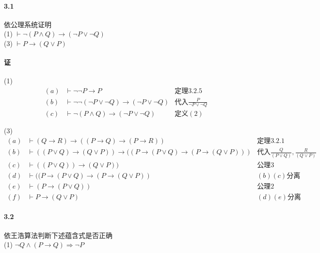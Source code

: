 \documentclass[hyperref, UTF8]{ctexart}
\newcommand{\zhfenli}{\text{分离}}
\newcommand{\zhdairu}{\text{代入}}
\newcommand{\zhaxiom}{\text{公理}}
\newcommand{\zhtheorem}{\text{定理}}
\newcommand{\zhdefinition}{\text{定义}}
\begin{document}
\paragraph{3.1}\label{3.1}
依公理系统证明 \\

(1) $  \vdash \lnot (P \land Q) \rightarrow ( \lnot P \lor \lnot Q) $ \\

(3) $ \vdash P \rightarrow (Q \lor P) $

\paragraph{证}

(1)
\begin{align*}
(a) & \vdash \lnot \lnot P \rightarrow P & \zhtheorem 3.2.5 \\
(b) & \vdash \lnot \lnot ( \lnot P \lor \lnot Q) \rightarrow ( \lnot P \lor \lnot Q) & \zhdairu \frac{P}{ \lnot P \lor \lnot Q} \\
(c) & \vdash \lnot (P \land Q) \rightarrow ( \lnot P \lor \lnot Q) & \zhdefinition (2) 
\end{align*}

(3)
\begin{align*}
(a) & \vdash (Q \rightarrow R) \rightarrow ((P \rightarrow Q) \rightarrow (P \rightarrow R)) & \zhtheorem 3.2.1 \\
(b) & \vdash ((P \lor Q) \rightarrow (Q \lor P)) \rightarrow ((P \rightarrow (P \lor Q) \rightarrow (P \rightarrow (Q \lor P))) & \zhdairu \frac{Q}{(P \lor Q)},\frac{R}{(Q \lor P)} \\
(c) & \vdash ((P \lor Q)) \rightarrow (Q \lor P)) & \zhaxiom 3 \\
(d) & \vdash ((P \rightarrow (P \lor Q) \rightarrow (P \rightarrow (Q \lor P)) & (b)(c) \zhfenli \\
(e) & \vdash (P \rightarrow (P \lor Q)) & \zhaxiom 2 \\
(f) & \vdash P \rightarrow (Q \lor P) & (d)(e) \zhfenli 
\end{align*}


\paragraph{3.2}\label{3.2} 
依王浩算法判断下述蕴含式是否正确 \\

(1) $  \lnot Q \land (P \rightarrow Q) \Rightarrow \lnot P $ 
\end{document}
